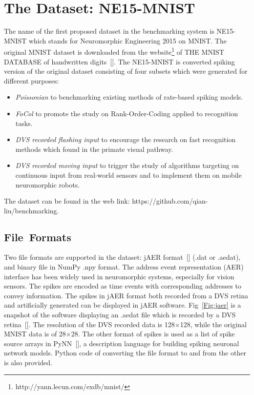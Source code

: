 \section{The Dataset: NE15-MNIST}
\label{sec:data}
The name of the first proposed dataset in the benchmarking system is NE15-MNIST which stands for Neuromorphic Engineering 2015 on MNIST.
The original MNIST dataset is downloaded from the website\footnote{http://yann.lecun.com/exdb/mnist/} of THE MNIST DATABASE of handwritten digits~[\cite{lecun_gradient-based_1998}].
The NE15-MNIST is converted spiking version of the original dataset consisting of four subsets which were generated for different purposes:
\begin{itemize}
	\item \textit{Poissonian}
	to benchmarking existing methods of rate-based spiking models.
	\item \textit{FoCol}
	to promote the study on Rank-Order-Coding applied to recognition tasks.
	\item \textit{DVS recorded flashing input}
	to encourage the research on fast recognition methods which found in the primate visual pathway.
	\item \textit{DVS recorded moving input}
	to trigger the study of algorithms targeting on continuous input from real-world sensors and to implement them on mobile neuromorphic robots.
\end{itemize}
The dataset can be found in the web link: https://github.com/qian-liu/benchmarking.
\subsection{File~Formats}
	
Two file formats are supported in the dataset: jAER format~[\cite{delbruck2008frame}] (.dat or .aedat), and binary file in NumPy .npy format.
The  address event representation (AER) interface has been widely used in neuromorphic systems, especially for vision sensors.
The spikes are encoded as time events with corresponding addresses to convey information.
The spikes in jAER format both recorded from a DVS retina and artificially generated can be displayed in jAER software.
Fig~\ref{Fig:jaer} is a snapshot of the software displaying an .aedat file which is recorded by a DVS retina~[\cite{serrano-gotarredona_128_2013}].
The resolution of the DVS recorded data is 128$\times$128, while the original MNIST data is of 28$\times$28.
The other format of spikes is used as a list of spike source arrays in PyNN~[\cite{davison2008pynn}], a description language for building spiking neuronal network models.
Python code of converting the file format to and from the other is also provided.

